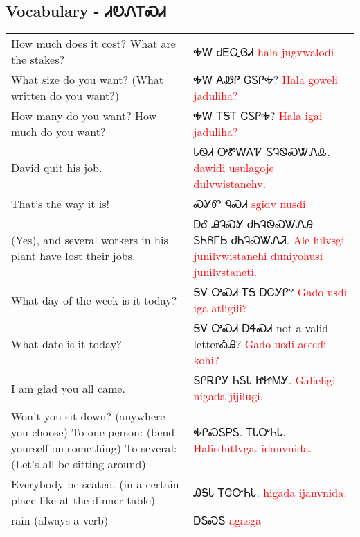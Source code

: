 \begin{multicols}
\subsection{Vocabulary - ᏗᎧᏁᎢᏍᏗ 
}
\begin{minipage}{\linewidth}
\begin{tabular}{p{5cm} p{9cm}}
How much does it cost?  What are the stakes? & ᎭᎳ ᏧᎬᏩᎶᏗ 
 \newline \textcolor{red}{hala jugvwalodi}\\
What size do you want?  (What written do you want?) & ᎭᎳ ᎪᏪᎵ ᏣᏚᎵᎭ? 
 \newline \textcolor{red}{Hala goweli jaduliha?}\\
How many do you want? How much do you want? & ᎭᎳ ᎢᎦᎢ ᏣᏚᎵᎭ? 
 \newline \textcolor{red}{Hala igai jaduliha?}\\
David quit his job. & ᏓᏫᏗ ᎤᏑᎳᎪᏤ ᏚᎸᏫᏍᏔᏁᎲ. 
 \newline \textcolor{red}{dawidi usulagoje dulvwistanehv.}\\
That's the way it is! & ᏍᎩᏛ ᏄᏍᏗ 
 \newline \textcolor{red}{sgidv nusdi}\\
(Yes), and several workers in his plant have lost their jobs. & ᎠᎴ ᎯᎸᏍᎩ ᏧᏂᎸᏫᏍᏔᏁᎯ ᏚᏂᏲᎱᏏ ᏧᏂᎸᏍᏔᏁᏘ. 
 \newline \textcolor{red}{Ale hilvsgi junilvwistanehi duniyohusi junilvstaneti.}\\
What day of the week is it today? & ᎦᏙ ᎤᏍᏗ ᎢᎦ ᎠᏟᎩᎵ? 
 \newline \textcolor{red}{Gado usdi iga atligili?}\\
What date is it today? & ᎦᏙ ᎤᏍᏗ ᎠᏎᏍᏗ not a valid letterᎣᎯ? 
 \newline \textcolor{red}{Gado usdi asesdi kohi?}\\
I am glad you all came. & ᎦᎵᎡᎵᎩ ᏂᎦᏓ ᏥᏥᎷᎩ. 
 \newline \textcolor{red}{Galieligi nigada jijilugi.}\\
Won't you sit down?  (anywhere you choose) To one person: (bend yourself on something) To several: (Let's all be sitting around) & ᎭᎵᏍᏚᏢᎦ. ᎢᏓᏅᏂᏓ. 
 \newline \textcolor{red}{Halisdutlvga. idanvnida.}\\
Everybody be seated. (in a certain place like at the dinner table) & ᎯᎦᏓ ᎢᏣᏅᏂᏓ. 
 \newline \textcolor{red}{higada ijanvnida.}\\
rain (always a verb) & ᎠᎦᏍᎦ 
 \newline \textcolor{red}{agasga}\\

\end{tabular}
\end{minipage}
\end{multicols}
